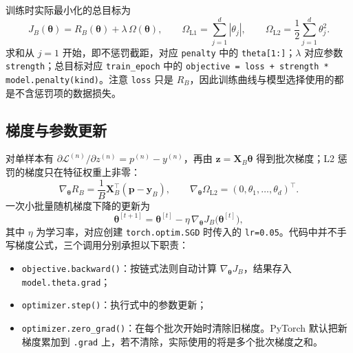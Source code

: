 \documentclass[UTF8,a4paper,11pt,fontset=fandol]{ctexart}
\begin{document}
训练时实际最小化的总目标为
\begin{equation}
J_B(\boldsymbol\theta)=R_B(\boldsymbol\theta)+\lambda\,\Omega(\boldsymbol\theta),\qquad
\Omega_{\mathrm{L1}}=\sum_{j=1}^{d}|\theta_j|,\qquad
\Omega_{\mathrm{L2}}=\frac12\sum_{j=1}^{d}\theta_j^2.
\end{equation}
求和从 $j=1$ 开始，即不惩罚截距，对应 \texttt{penalty} 中的 \texttt{theta[1:]}；$\lambda$ 对应参数 \texttt{strength}；总目标对应 \texttt{train\_epoch} 中的 \texttt{objective = loss + strength * model.penalty(kind)}。注意 \texttt{loss} 只是 $R_B$，因此训练曲线与模型选择使用的都是不含惩罚项的数据损失。
\subsection{梯度与参数更新}
对单样本有 $\partial\mathcal L^{(n)}/\partial z^{(n)}=p^{(n)}-y^{(n)}$，再由 $\mathbf z=\mathbf X_B\boldsymbol\theta$ 得到批次梯度；L2 惩罚的梯度只在特征权重上非零：
\begin{equation}
\nabla_{\boldsymbol\theta}R_B=\frac1B\mathbf X_B^\top(\mathbf p-\mathbf y_B),\qquad
\nabla_{\boldsymbol\theta}\Omega_{\mathrm{L2}}=(0,\theta_1,\ldots,\theta_d)^\top.
\end{equation}
一次小批量随机梯度下降的更新为
\begin{equation}
\boldsymbol\theta^{[t+1]}=\boldsymbol\theta^{[t]}-\eta\,\nabla_{\boldsymbol\theta}J_B\bigl(\boldsymbol\theta^{[t]}\bigr),
\end{equation}
其中 $\eta$ 为学习率，对应创建 \texttt{torch.optim.SGD} 时传入的 \texttt{lr=0.05}。代码中并不手写梯度公式，三个调用分别承担以下职责：
\begin{itemize}
\item \texttt{objective.backward()}：按链式法则自动计算 $\nabla_{\boldsymbol\theta}J_B$，结果存入 \texttt{model.theta.grad}；
\item \texttt{optimizer.step()}：执行式中的参数更新；
\item \texttt{optimizer.zero\_grad()}：在每个批次开始时清除旧梯度。PyTorch 默认把新梯度累加到 \texttt{.grad} 上，若不清除，实际使用的将是多个批次梯度之和。
\end{itemize}
\end{document}

